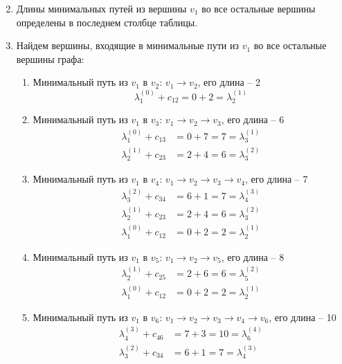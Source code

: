 \documentclass[a4paper, 12pt]{article}
\begin{document}
    \begin{enumerate}
        \setcounter{enumi}{1}
        \item Длины минимальных путей из вершины $v_1$ во все остальные вершины определены в последнем столбце таблицы.
        \item Найдем вершины, входящие в минимальные пути из $v_1$ во все остальные вершины графа:
        \begin{enumerate}[label*=\arabic*.]
            \item Минимальный путь из $v_1$ в $v_2$: $v_1 \rightarrow v_2$, его длина -- 2
            $$ \lambda_1^{(0)} + c_{12} = 0 + 2 = \lambda_2^{(1)} $$
            \item Минимальный путь из $v_1$ в $v_3$: $v_1 \rightarrow v_2 \rightarrow v_3$, его длина -- 6
            \begin{align*}
                \lambda_1^{(0)} + c_{13} &= 0 + 7 = 7 = \lambda_3^{(1)} \\
                \lambda_2^{(1)} + c_{23} &= 2 + 4 = 6 = \lambda_3^{(2)}
            \end{align*}
            \item Минимальный путь из $v_1$ в $v_4$: $v_1 \rightarrow v_2 \rightarrow v_3 \rightarrow v_4 $, его длина -- 7
            \begin{align*}
                \lambda_3^{(2)} + c_{34} &= 6 + 1 = 7 = \lambda_4^{(3)} \\
                \lambda_2^{(1)} + c_{23} &= 2 + 4 = 6 = \lambda_3^{(2)} \\
                \lambda_1^{(0)} + c_{12} &= 0 + 2 = 2 = \lambda_2^{(1)}
            \end{align*}
            \item Минимальный путь из $v_1$ в $v_5$: $v_1 \rightarrow v_2 \rightarrow v_5$, его длина -- 8
            \begin{align*}
                \lambda_2^{(1)} + c_{25} &= 2 + 6 = 6 = \lambda_5^{(2)} \\
                \lambda_1^{(0)} + c_{12} &= 0 + 2 = 2 = \lambda_2^{(1)}
            \end{align*}
            \item Минимальный путь из $v_1$ в $v_6$: $v_1 \rightarrow v_2 \rightarrow v_3 \rightarrow v_4 \rightarrow v_6$, его длина -- 10
            \begin{align*}
                \lambda_4^{(3)} + c_{46} &= 7 + 3 = 10 = \lambda_6^{(4)} \\
                \lambda_3^{(2)} + c_{34} &= 6 + 1 = 7 = \lambda_4^{(3)} \\

\end{align*}
\end{enumerate}
\end{enumerate}
\end{document}
